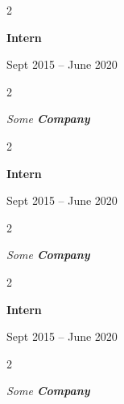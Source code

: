 \documentclass[10pt, letterpaper]{article}
\newenvironment{twocolentry}[2][]{
    \onecolentry
    \def\secondColumn{#2}
    \setcolumnwidth{\fill, 4.5 cm}
    \begin{paracol}{2}
}{
    \switchcolumn \raggedleft \secondColumn
    \end{paracol}
    \endonecolentry
} %
\begin{document}
                \begin{twocolentry}{
                    Sept 2015 – June 2020
                }
                \textbf{Intern}
                \end{twocolentry}
            \begin{twocolentry}{
            }
            \textit{Some \textbf{Company}}
            \end{twocolentry}



        \vspace{0.2 cm}

                \begin{twocolentry}{
                    Sept 2015 – June 2020
                }
                \textbf{Intern}
                \end{twocolentry}
            \begin{twocolentry}{
            }
            \textit{Some \textbf{Company}}
            \end{twocolentry}



        \vspace{0.2 cm}

                \begin{twocolentry}{
                    Sept 2015 – June 2020
                }
                \textbf{Intern}
                \end{twocolentry}
            \begin{twocolentry}{
            }
            \textit{Some \textbf{Company}}
            \end{twocolentry}
\end{document}
